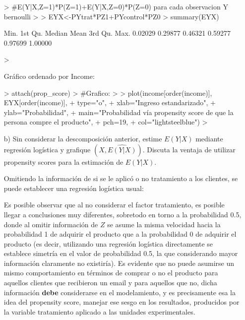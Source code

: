 \documentclass[11pt,onside]{article}
\begin{document}
\begin{itemize}
\begin{Schunk}
\begin{Sinput}
> #E(Y|X,Z=1)*P(Z=1)+E(Y|X,Z=0)*P(Z=0) para cada observacion Y bernoulli
> 
> EYX<-PYtrat*PZ1+PYcontrol*PZ0  
> summary(EYX)
\end{Sinput}
\begin{Soutput}
   Min. 1st Qu.  Median    Mean 3rd Qu.    Max. 
0.02029 0.29877 0.46321 0.59277 0.97699 1.00000 
\end{Soutput}
\begin{Sinput}
> 
\end{Sinput}
\end{Schunk}


Gráfico ordenado por Income:

\begin{Schunk}
\begin{Sinput}
> attach(prop_score)
> #Grafico:
> 
> plot(income[order(income)], EYX[order(income)], 
+      type="o", 
+      xlab="Ingreso estandarizado", 
+      ylab="Probabilidad", 
+      main="Probabilidad vía propensity score de que la persona compre el producto", 
+      pch=19, 
+      col="lightsteelblue")  
> 
\end{Sinput}
\end{Schunk}

\item[b)]  Sin considerar la descomposición anterior, estime $E(Y\vert X)$ mediante regresión logística y grafique $(X,\widehat{E(Y\vert X)})$. Discuta la ventaja de utilizar propensity scores para la estimación de $E(Y\vert X)$. 


Omitiendo la información de si se le aplicó o no tratamiento a los clientes, se puede establecer una regresión logística usual:

\begin{Schunk}
\end{Schunk}

Es posible observar que al no considerar el factor tratamiento, es posible llegar a conclusiones muy diferentes, sobretodo en torno a la probabilidad 0.5, donde al omitir información de $Z$ se asume la misma velocidad hacia la probabilidad 1 de adquirir el producto que a la probabilidad 0 de adquirir el producto (es decir, utilizando una regresión logística directamente se establece simetría en el valor de probabilidad 0.5, la que considerando mayor información claramente no existiría). Es evidente que no puede asumirse un mismo comportamiento en términos de comprar o no el producto para aquellos clientes que recibieron un email y para aquellos que no, dicha información \textbf{debe} considerarse en el modelamiento, y es precisamente esa la idea del propensity score, manejar ese sesgo en los resultados, producidos por la variable tratamiento aplicado a las unidades experimentales.
\end{itemize}
\end{document}
